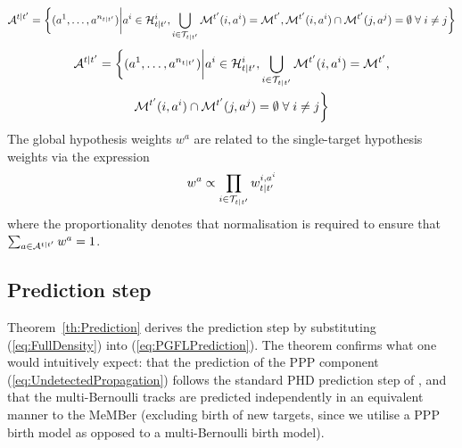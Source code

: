 \documentclass[journal,twoside]{IEEEtran}
\theoremstyle{plain}
\begin{document}
%
\ifCLASSOPTIONdraftcls
\begin{equation}\label{eq:AssocAlphabet}
{\cal A}^{t|t'} = \bigg\{
(a^1,\dots,a^{n_{t|t'}})
\bigg| 
a^i\in{\cal H}^i_{t|t'}, 
\bigcup_{i\in{\cal T}_{t|t'}}{\cal M}^{t'}(i,a^i)={\cal M}^{t'},
{\cal M}^{t'}(i,a^i)\cap{\cal M}^{t'}(j,a^j)=\emptyset \;\forall\; i\neq j 
\bigg\}
\end{equation}
\else
\begin{multline}\label{eq:AssocAlphabet}
{\cal A}^{t|t'} = \bigg\{
(a^1,\dots,a^{n_{t|t'}})
\bigg| 
a^i\in{\cal H}^i_{t|t'}, 
\bigcup_{i\in{\cal T}_{t|t'}}{\cal M}^{t'}(i,a^i)={\cal M}^{t'},
\\
{\cal M}^{t'}(i,a^i)\cap{\cal M}^{t'}(j,a^j)=\emptyset \;\forall\; i\neq j 
\bigg\}
\end{multline}
\fi
%
The global hypothesis weights $w^a$ are related to the single-target hypothesis weights via the expression
%
\begin{equation}\label{eq:GlobalHypWeight}
w^a \propto \prod_{i\in{\cal T}_{t|t'}}w_{t|t'}^{i,a^i}
\end{equation}
%
where the proportionality denotes that normalisation is required to ensure that $\sum_{a\in{\cal A}^{t|t'}}w^a=1$.


\subsection{Prediction step}
%
Theorem~\ref{th:Prediction} derives the prediction step by substituting (\ref{eq:FullDensity}) into (\ref{eq:PGFLPrediction}). The theorem confirms what one would intuitively expect: that the prediction of the PPP component (\ref{eq:UndetectedPropagation}) follows the standard PHD prediction step of \cite{Mah03,VoMa06}, and that the multi-Bernoulli tracks are predicted independently in an equivalent manner to the MeMBer \cite{Mah07,VoVo09} (excluding birth of new targets, since we utilise a PPP birth model as opposed to a multi-Bernoulli birth model).
\end{document}
